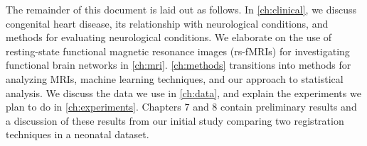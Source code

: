 The remainder of this document is laid out as follows. In \autoref{ch:clinical}, we discuss congenital heart disease, its relationship with neurological conditions, and methods for evaluating neurological conditions. We elaborate on the use of resting-state functional magnetic resonance images (rs-fMRIs) for investigating functional brain networks in \autoref{ch:mri}. \autoref{ch:methods} transitions into methods for analyzing MRIs, machine learning techniques, and our approach to statistical analysis. We discuss the data we use in \autoref{ch:data}, and explain the experiments we plan to do in \autoref{ch:experiments}. 
Chapters 7 and 8 contain preliminary results and a discussion of these results from our initial study comparing two registration techniques in a neonatal dataset.
